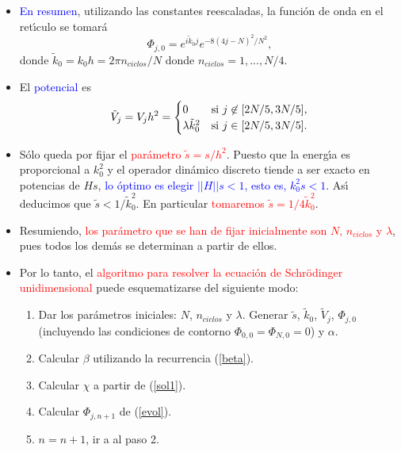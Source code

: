 \documentclass[12pt,spanish]{iopart}
\def\az{\textcolor{blue}}
\def\ro{\textcolor{red}}
\begin{document}
\begin{itemize}
\item \az{En resumen}, utilizando las constantes reescaladas, la funci{\'o}n de onda en el ret{\'\i}culo se tomar{\'a}
%
\begin{equation}
\Phi_{j,0}=e^{i\tilde k_0 j} e^{-8(4j-N)^2/N^2},
\end{equation}
%
donde $\tilde k_0=k_0 h=2\pi n_{ciclos}/N$ donde $n_{ciclos}=1,...,N/4$. 

\item El \az{potencial} es
\begin{equation}
\tilde V_j =V_j h^2=
\begin{cases}
0  & \text{si  $j\not\in [2N/5,3N/5]$},  \cr
\lambda\tilde k_0^2 &  \text{si $j\in  [2N/5,3N/5]$}.
\end{cases}
\end{equation}
\vspace{0.2cm}

\item S\'olo queda por fijar el \ro{par{\'a}metro $\tilde s=s/h^2$}. Puesto que la energ{\'\i}a es proporcional a $k_0^2$
y el operador din{\'a}mico discreto tiende a ser exacto en potencias de $H s$, \az{lo {\'o}ptimo es elegir
$||H||s<1$, esto es, $k_0^2 s<1$}. As\'{\i} deducimos que $\tilde s < 1/\tilde k_0^2$. En particular \ro{tomaremos $\tilde s=1/4\tilde
k_0^2$}.

\item Resumiendo, \ro{los par{\'a}metro que se han de fijar inicialmente son $N$, $n_{ciclos}$ y $\lambda$}, pues todos
los dem{\'a}s se determinan a partir de ellos. 

\item Por lo tanto, el \ro{algoritmo para resolver la ecuaci{\'o}n de Schr\"odinger unidimensional} puede esquematizarse del siguiente modo:
%
\begin{enumerate}
\item Dar los par{\'a}metros iniciales: $N$, $n_{ciclos}$ y $\lambda$. Generar $\tilde s$, $\tilde k_0$, $\tilde V_j$,
$\Phi_{j,0}$ (incluyendo las condiciones de contorno $\Phi_{0,0}=\Phi_{N,0}=0$) y $\alpha$.
\item Calcular $\beta$ utilizando la recurrencia (\ref{beta}).
\item Calcular $\chi$ a partir de (\ref{sol1}).
\item Calcular $\Phi_{j,n+1}$ de (\ref{evol}).
\item $n=n+1$, ir a al paso 2.
\end{enumerate}

\end{itemize}
\end{document}

